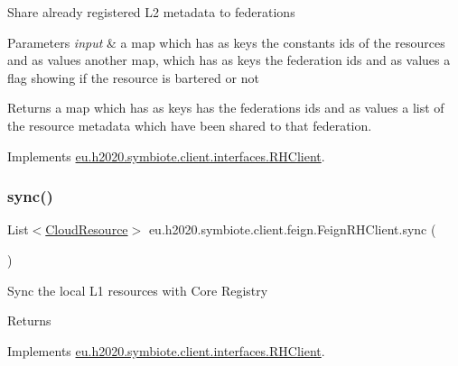 Share already registered L2 metadata to federations


\begin{DoxyParams}{Parameters}
{\em input} & a map which has as keys the constants ids of the resources and as values another map, which has as keys the federation ids and as values a flag showing if the resource is bartered or not \\
\hline
\end{DoxyParams}
\begin{DoxyReturn}{Returns}
a map which has as keys has the federations ids and as values a list of the resource metadata which have been shared to that federation. 
\end{DoxyReturn}


Implements \hyperlink{interfaceeu_1_1h2020_1_1symbiote_1_1client_1_1interfaces_1_1RHClient_ab033d6b4967030ca4d63f8186b147a88}{eu.\+h2020.\+symbiote.\+client.\+interfaces.\+R\+H\+Client}.

\mbox{\label{classeu_1_1h2020_1_1symbiote_1_1client_1_1feign_1_1FeignRHClient_a8181d6656e2c7dea2d01bc5ee16e8639}} 
\subsubsection{\texorpdfstring{sync()}{sync()}}
{\footnotesize\ttfamily List$<$\hyperlink{classeu_1_1h2020_1_1symbiote_1_1cloud_1_1model_1_1internal_1_1CloudResource}{Cloud\+Resource}$>$ eu.\+h2020.\+symbiote.\+client.\+feign.\+Feign\+R\+H\+Client.\+sync (\begin{DoxyParamCaption}{ }\end{DoxyParamCaption})}

Sync the local L1 resources with Core Registry

\begin{DoxyReturn}{Returns}

\end{DoxyReturn}


Implements \hyperlink{interfaceeu_1_1h2020_1_1symbiote_1_1client_1_1interfaces_1_1RHClient_ae450ac97070e6968eb9d1bfcfd3ae3e6}{eu.\+h2020.\+symbiote.\+client.\+interfaces.\+R\+H\+Client}.

